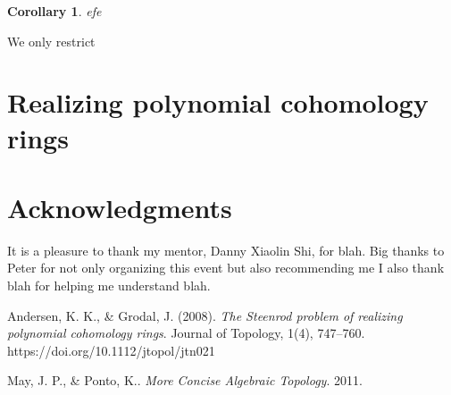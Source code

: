 \documentclass[psamsfonts]{amsart}
\newtheorem{cor}{Corollary}[section]
\theoremstyle{definition}
\numberwithin{equation}{section}
\begin{document}
\begin{cor}
efe
\end{cor}

\begin{remark}
We only restrict
\end{remark}


\section{Realizing polynomial cohomology rings}

\section*{Acknowledgments}

It is a pleasure to thank my mentor, Danny Xiaolin Shi, for blah. Big thanks to Peter for not only organizing this event but also recommending me I also thank blah for helping me understand blah.

\begin{thebibliography}{99}

Andersen, K. K., \& Grodal, J. (2008). \textit{The Steenrod problem of realizing polynomial cohomology rings}. Journal of Topology, 1(4), 747–760. https://doi.org/10.1112/jtopol/jtn021 

May, J. P., \& Ponto, K.. \textit{More Concise Algebraic Topology}. 2011.

\end{thebibliography}
\end{document}
